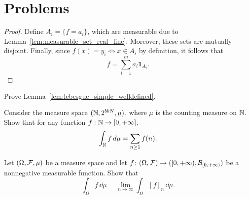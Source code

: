 



\section{Problems}

\begin{problem}\label{prb:standard_representation_simple}


\begin{proof}
Define $A_i = \{f = a_i\}$, which are measurable due to Lemma~\ref{lem:measurable_set_real_line}. Moreover, these sets are mutually disjoint. Finally, since $f(x) = y_i \iff x \in A_i$ by definition, it follows that
\[
	f = \sum_{i = 1}^m a_i \mathbf{1}_{A_i}.
\]
\end{proof}
\end{problem}

\begin{problem}\label{prb:lebesgue_simple_welldefined}
Prove Lemma~\ref{lem:lebesgue_simple_welldefined}.
\end{problem}

\begin{problem}
	Consider the measure space $(\mathbb N,2^{bbN},\mu)$, where $\mu$ is the counting measure on $\mathbb N$. Show that for any function $f:\mathbb N\to[0,+\infty]$,
	\[
		\int_{\mathbb N} f\,d\mu = \sum_{n\ge 1} f(n).
	\]
\end{problem}

\begin{problem}
	\label{prb:simple-approx-integral}
 Let $(\Omega, \mathcal F, \mu)$ be a measure space and let $f\colon (\Omega,\mathcal F) \to ([0,+\infty), \mathcal B_{[0,+\infty)})$ be a nonnegative measurable function. Show that
\[
\int_\Omega f\, \dd \mu = \lim_{n \to \infty} \int_\Omega [f]_n\, \dd \mu.
\]	
\end{problem}

